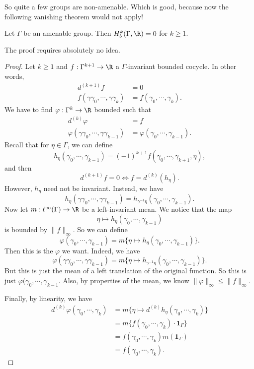 \documentclass[a4paper]{article}
\begin{document}
So quite a few groups are non-amenable. Which is good, because now the following vanishing theorem would not apply!

\begin{prop}
  Let $\Gamma$ be an amenable group. Then $H^k_b(\Gamma, \R) = 0$ for $k \geq 1$.
\end{prop}

The proof requires absolutely no idea.
\begin{proof}
  Let $k \geq 1$ and $f: \Gamma^{k + 1} \to \R$ a $\Gamma$-invariant bounded cocycle. In other words,
  \begin{align*}
    d^{(k + 1)} f &= 0\\
    f(\gamma\gamma_0, \cdots, \gamma\gamma_k) &= f(\gamma_0, \cdots, \gamma_k).
  \end{align*}
  We have to find $\varphi: \Gamma^k \to \R$ bounded such that
  \begin{align*}
    d^{(k)} \varphi &= f\\
    \varphi(\gamma\gamma_0, \cdots, \gamma\gamma_{k - 1}) &= \varphi(\gamma_0, \cdots, \gamma_{k - 1}).
  \end{align*}
  Recall that for $\eta \in \Gamma$, we can define
  \[
    h_\eta (\gamma_0, \cdots, \gamma_{k - 1}) = (-1)^{k + 1} f(\gamma_0, \cdots, \gamma_{k + 1}, \eta),
  \]
  and then
  \[
    d^{(k + 1)}f = 0 \Longleftrightarrow f = d^{(k)}(h_\eta).
  \]
  However, $h_\eta$ need not be invariant. Instead, we have
  \[
    h_\eta(\gamma\gamma_0, \cdots, \gamma\gamma_{k - 1}) = h_{\gamma^{-1} \eta} (\gamma_0, \cdots, \gamma_{k - 1}).
  \]
  Now let $m : \ell^\infty(\Gamma) \to \R$ be a left-invariant mean. We notice that the map
  \[
    \eta \mapsto h_\eta (\gamma_0, \cdots, \gamma_{k - 1})
  \]
  is bounded by $\|f\|_\infty$. So we can define
  \[
    \varphi(\gamma_0, \cdots, \gamma_{k - 1}) = m \Big\{ \eta \mapsto h_\eta (\gamma_0, \cdots, \gamma_{k - 1})\Big\}.
  \]
  Then this is the $\varphi$ we want. Indeed, we have
  \[
    \varphi(\gamma \gamma_0, \cdots, \gamma \gamma_{k - 1}) = m \Big\{ \eta \mapsto h_{\gamma^{-1}\eta} (\gamma_0, \cdots, \gamma_{k - 1})\Big\}.
  \]
  But this is just the mean of a left translation of the original function. So this is just $\varphi(\gamma_0, \cdots, \gamma_{k - 1}$. Also, by properties of the mean, we know $\|\varphi\|_\infty \leq \|f\|_\infty$.

  Finally, by linearity, we have
  \begin{align*}
    d^{(k)} \varphi(\gamma_0, \cdots, \gamma_k) &= m \Big\{ \eta \mapsto d^{(k)} h_\eta (\gamma_0, \cdots, \gamma_k) \Big\}\\
    &= m \Big\{ f(\gamma_0, \cdots, \gamma_k) \cdot \mathbf{1}_\Gamma\Big\}\\
    &= f(\gamma_0, \cdots, \gamma_k) m (\mathbf{1}_\Gamma)\\
    &= f(\gamma_0, \cdots, \gamma_k).
  \end{align*}
\end{proof}
\end{document}
